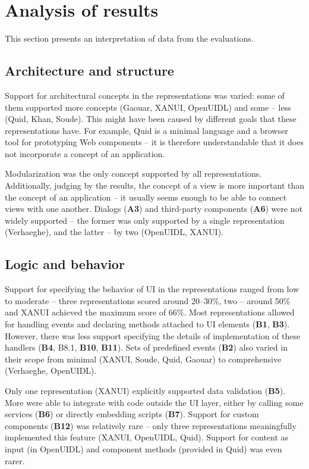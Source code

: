 \section{Analysis of results}\label{sec:analysis-of-results}
This section presents an interpretation of data from the evaluations.

\subsection{Architecture and structure}\label{subsec:4-2-architecture-and-structure}
Support for architectural concepts in the representations was varied: some of them supported more concepts (Gaouar, XANUI, OpenUIDL) and some -- less (Quid, Khan, Soude).
This might have been caused by different goals that these representations have.
For example, Quid is a minimal language and a browser tool for prototyping Web components -- it is therefore understandable that it does not incorporate a concept of an application.

Modularization was the only concept supported by all representations.
Additionally, judging by the results, the concept of a view is more important than the concept of an application -- it usually seems enough to be able to connect views with one another.
Dialogs (\textbf{A3}) and third-party components (\textbf{A6}) were not widely supported -- the former was only supported by a single representation (Verhaeghe), and the latter -- by two (OpenUIDL, XANUI).

\subsection{Logic and behavior}\label{subsec:4-2-logic-and-behavior}
Support for specifying the behavior of UI in the representations ranged from low to moderate -- three representations scored around 20--30\%, two -- around 50\% and XANUI achieved the maximum score of 66\%.
Most representations allowed for handling events and declaring methods attached to UI elements (\textbf{B1}, \textbf{B3}).
However, there was less support specifying the details of implementation of these handlers (\textbf{B4}, B8.1, \textbf{B10}, \textbf{B11}).
Sets of predefined events (\textbf{B2}) also varied in their scope from minimal (XANUI, Soude, Quid, Gaouar) to comprehensive (Verhaeghe, OpenUIDL).

Only one representation (XANUI) explicitly supported data validation (\textbf{B5}).
More were able to integrate with code outside the UI layer, either by calling some services (\textbf{B6}) or directly embedding scripts (\textbf{B7}).
Support for custom components (\textbf{B12}) was relatively rare -- only three representations meaningfully implemented this feature (XANUI, OpenUIDL, Quid).
Support for content as input (in OpenUIDL) and component methods (provided in Quid) was even rarer.

